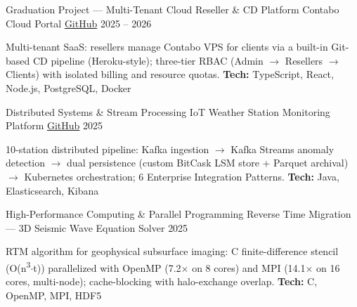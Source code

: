 
\begin{cventries}

  \cventry
    {Graduation Project --- Multi-Tenant Cloud Reseller \& CD Platform}
    {Contabo Cloud Portal}
    {\href{https://github.com/Ibrahimtareq952001/CloudDeploy}{GitHub}}
    {2025 -- 2026}
    {
      \begin{cvitems}
        \item {Multi-tenant SaaS: resellers manage Contabo VPS for clients via a built-in Git-based CD pipeline (Heroku-style); three-tier RBAC (Admin $\rightarrow$ Resellers $\rightarrow$ Clients) with isolated billing and resource quotas. \textbf{Tech:} TypeScript, React, Node.js, PostgreSQL, Docker}
      \end{cvitems}
    }

  \entrygap
  \cventry
    {Distributed Systems \& Stream Processing}
    {IoT Weather Station Monitoring Platform}
    {\href{https://github.com/Ibrahimtareq952001/IoT-Weather-Station-Monitoring-Platform}{GitHub}}
    {2025}
    {
      \begin{cvitems}
        \item {10-station distributed pipeline: Kafka ingestion $\rightarrow$ Kafka Streams anomaly detection $\rightarrow$ dual persistence (custom BitCask LSM store + Parquet archival) $\rightarrow$ Kubernetes orchestration; 6 Enterprise Integration Patterns. \textbf{Tech:} Java, Elasticsearch, Kibana}
      \end{cvitems}
    }

  \entrygap
  \cventry
    {High-Performance Computing \& Parallel Programming}
    {Reverse Time Migration --- 3D Seismic Wave Equation Solver}
    {}
    {2025}
    {
      \begin{cvitems}
        \item {RTM algorithm for geophysical subsurface imaging: C finite-difference stencil (O(n\textsuperscript{3}$\cdot$t)) parallelized with OpenMP (7.2$\times$ on 8 cores) and MPI (14.1$\times$ on 16 cores, multi-node); cache-blocking with halo-exchange overlap. \textbf{Tech:} C, OpenMP, MPI, HDF5}
      \end{cvitems}
    }


\end{cventries}
